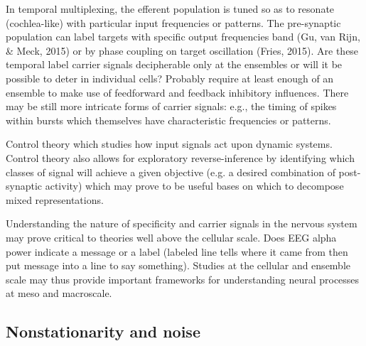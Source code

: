 \documentclass[12pt]{article}
\begin{document}
In temporal multiplexing, the efferent population is tuned so as to resonate (cochlea-like) with particular input frequencies or patterns.
The pre-synaptic population can label targets with specific output frequencies band (Gu, van Rijn, \& Meck, 2015) or
by phase coupling on target oscillation (Fries, 2015). 
Are these temporal label carrier signals decipherable only at the ensembles or will it be possible to deter in individual cells? 
Probably require at least enough of an ensemble to make use of feedforward and feedback inhibitory influences.
There may be still more intricate forms of carrier signals: e.g., the timing of spikes within bursts which themselves have characteristic frequencies or patterns.

Control theory which studies how input signals act upon dynamic systems. Control theory also allows for exploratory reverse-inference
by identifying which classes of signal will achieve a given objective (e.g. a desired combination of post-synaptic activity) which may prove to be useful bases on which to
decompose mixed representations.

Understanding the nature of specificity and carrier signals in the nervous system may prove critical to theories well above the cellular scale. Does EEG alpha power indicate a
message or a label (labeled line tells where it came from then put message into a line to say something). 
Studies at the cellular and ensemble scale may thus provide important frameworks for understanding neural processes at meso and macroscale.

\subsection{Nonstationarity and noise}
\end{document}
